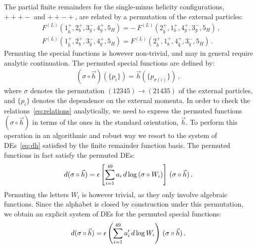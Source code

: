 \documentclass[main.tex]{subfiles}
\begin{document}
The partial finite remainders for the single-minus helicity configurations, $+++-$ and $++-+$, are related by a permutation of the external particles:
\begin{equation} \label{eq:relations}
\begin{aligned} 
 & F^{(L)}(1^+_{\bar{b}},2^+_{b},3^-_g,4^+_g,5_{H}) = - \, F^{(L)}(2^+_{\bar{b}},1^+_{b},4^+_g,3^-_g,5_{H}) \,, \\
 & F^{(L)}(1^+_{\bar{b}},2^+_{b},3^-_{\bar{q}},4^+_q,5_{H}) = F^{(L)}(2^+_{\bar{b}},1^+_{b},4^+_{\bar{q}},3^-_q,5_{H}) \,.
\end{aligned}
\end{equation}
Permuting the special functions is however non-trivial, and may in general require analytic continuation. The permuted special functions are defined by:
\begin{align}
\left(\sigma \circ \vec{h} \right) (\{p_i\}) = \vec{h} ( \{p_{\sigma(i)}\} )\, ,
\end{align}
where $\sigma$ denotes the permutation $(12345)\to(21435)$ of the external particles, and $\{p_i\}$ denotes the dependence on the external momenta. In order to check the relations~\ref{eq:relations} analytically, we need to express the permuted functions $(\sigma \circ \vec{h} )$ in terms of the ones in the standard orientation, $\vec{h}$. To perform this operation in an algorithmic and robust way we resort to the system of DEs~\ref{eq:dh} satisfied by the finite remainder function basis. The permuted functions in fact satisfy the permuted DEs:
\begin{align}
d ( \sigma \circ \vec{h} ) = \epsilon \left[ \sum_{i=1}^{49} a_i \, d \log\left(\sigma \circ W_i \right) \right] \,  ( \sigma \circ \vec{h} ) \,.
\end{align}
Permuting the letters $W_i$ is however trivial, as they only involve algebraic functions. Since the alphabet is closed by construction under this permutation, we obtain an explicit system of DEs for the permuted special functions:
\begin{align} \label{eq:dsigmah}
d ( \sigma \circ \vec{h} ) = \epsilon \left( \sum_{i=1}^{49} a_i' \, d \log W_i  \right) \,  ( \sigma \circ \vec{h} ) \,.
\end{align}
\end{document}
